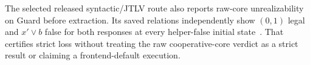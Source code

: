The selected released syntactic/JTLV route also reports raw-core
unrealizability on Guard before extraction. Its saved relations independently
show $(0,1)$ legal and $x'\lor b$ false for both responses at every
helper-false initial state~\cite{newartifact}. That certifies strict loss
without treating the raw cooperative-core verdict as a strict result
or claiming a frontend-default execution.
